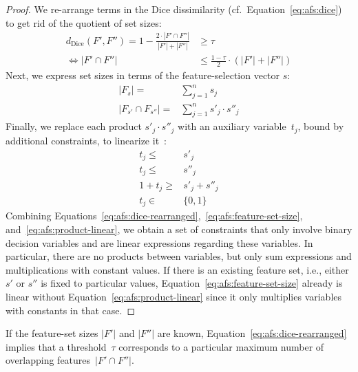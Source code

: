 \documentclass{article}
\theoremstyle{definition}
\begin{document}
\begin{proof}
We re-arrange terms in the Dice dissimilarity (cf.~Equation~\ref{eq:afs:dice}) to get rid of the quotient of set sizes:
%
\begin{equation}
	\begin{aligned}
		d_{\text{Dice}}(F',F'') = 1 - \frac{2 \cdot |F' \cap F''|}{|F'| + |F''|} &\geq \tau \\
		\Leftrightarrow |F' \cap F''| &\leq \frac{1 - \tau}{2} \cdot (|F'| + |F''|)
	\end{aligned}
	\label{eq:afs:dice-rearranged}
\end{equation}
%
Next, we express set sizes in terms of the feature-selection vector $s$:
%
\begin{equation}
	\begin{aligned}
		|F_s| =& \sum_{j=1}^n s_j \\
		|F_{s'} \cap F_{s''}| =& \sum_{j=1}^n s'_j \cdot s''_j
	\end{aligned}
	\label{eq:afs:feature-set-size}
\end{equation}
%
Finally, we replace each product $s'_j \cdot s''_j$ with an auxiliary variable~$t_j$, bound by additional constraints, to linearize it~\cite{mosek2022modeling}:
%
\begin{equation}
	\begin{aligned}
		t_j \leq& s'_j \\
		t_j \leq& s''_j \\
		1 + t_j \geq& s'_j + s''_j \\
		t_j \in& \{0,1\}
	\end{aligned}
	\label{eq:afs:product-linear}
\end{equation}
%
Combining Equations~\ref{eq:afs:dice-rearranged},~\ref{eq:afs:feature-set-size}, and~\ref{eq:afs:product-linear}, we obtain a set of constraints that only involve binary decision variables and are linear expressions regarding these variables.
In particular, there are no products between variables, but only sum expressions and multiplications with constant values.
If there is an existing feature set, i.e., either $s'$ or $s''$ is fixed to particular values, Equation~\ref{eq:afs:feature-set-size} already is linear without Equation~\ref{eq:afs:product-linear} since it only multiplies variables with constants in that case.
\end{proof}
%
If the feature-set sizes $|F'|$ and $|F''|$ are known, Equation~\ref{eq:afs:dice-rearranged} implies that a threshold~$\tau$ corresponds to a particular maximum number of overlapping features~$|F' \cap F''|$.
\end{document}
